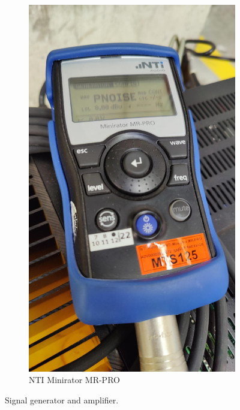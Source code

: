 \begin{figure}[H]
\begin{subfigure}[b]{0.3\textwidth}
         \includegraphics[width=\textwidth]{fig/signal_generator.jpg}
         \caption{NTI Minirator MR-PRO}
     \end{subfigure}
        \caption{Signal generator and amplifier.}
        \label{fig:signalgenerator}
\end{figure}

